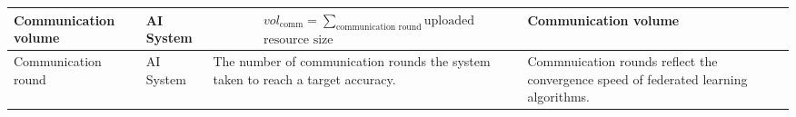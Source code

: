 \begin{table}[ht]
\begin{tabular}{|p{3cm}|l|p{6cm}|p{3cm}|p{1.5cm}|}
Communication volume
& AI System
&
\parbox{3cm}{
    \begin{equation} \label{equ:cv}  
    \begin{split}
& vol_{\text{comm}} = 
 \sum_{\text{communication round}} 
\text{uploaded} \\
& \text{resource size}
    \end{split}
    \end{equation}
}
& 
Communication volume
& \cite{DBLP:conf/aistats/McMahanMRHA17}
\\ \hline

Communication round
& AI System
&
The number of communication rounds the system taken to reach a target accuracy. 
& 
Commnuication rounds reflect the convergence speed of federated learning algorithms.
& \cite{DBLP:conf/aistats/McMahanMRHA17}
\\ \hline

\end{tabular}
\end{table}

